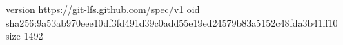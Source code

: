 version https://git-lfs.github.com/spec/v1
oid sha256:9a53ab970eee10df3fd491d39c0add55e19ed24579b83a5152c48fda3b41ff10
size 1492

